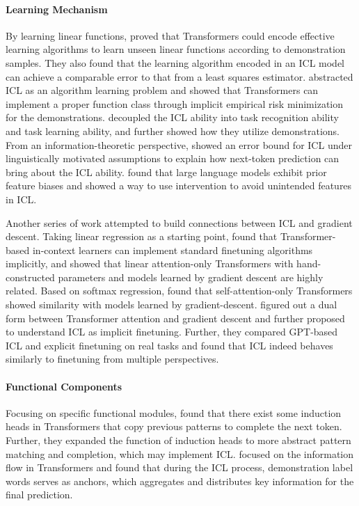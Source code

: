 \paragraph{Learning Mechanism} 
By learning linear functions, \citet{garg2022linear} proved that Transformers could encode effective learning algorithms to learn unseen linear functions according to demonstration samples. 
They also found that the learning algorithm encoded in an ICL model can achieve a comparable error to that from a least squares estimator. 
\citet{trm_as_alg} abstracted ICL as an algorithm learning problem and showed that Transformers can implement a proper function class through implicit empirical risk minimization for the demonstrations. 
\citet{tr_and_tl} decoupled the ICL ability into task recognition ability and task learning ability, and further showed how they utilize demonstrations. 
From an information-theoretic perspective, \citet{implicit_structure_induction} showed an error bound for ICL under linguistically motivated assumptions to explain how next-token prediction can bring about the ICL ability. 
\citet{inductive_bias} found that large language models exhibit prior feature biases and showed a way to use intervention to avoid unintended features in ICL. 

Another series of work attempted to build connections between ICL and gradient descent. 
Taking linear regression as a starting point, \citet{akyurek2022algorithm} found that Transformer-based in-context learners can implement standard finetuning algorithms implicitly, and \citet{icl_gd} showed that linear attention-only Transformers with hand-constructed parameters and models learned by gradient descent are highly related. 
Based on softmax regression, \citet{icl_weight_shifting} found that self-attention-only Transformers showed similarity with models learned by gradient-descent. 
\citet{dai2022iclft} figured out a dual form between Transformer attention and gradient descent and further proposed to understand ICL as implicit finetuning. 
Further, they compared GPT-based ICL and explicit finetuning on real tasks and found that ICL indeed behaves similarly to finetuning from multiple perspectives. 

\paragraph{Functional Components} 
Focusing on specific functional modules, \citet{olsson2022induction} found that there exist some induction heads in Transformers that copy previous patterns to complete the next token. 
Further, they expanded the function of induction heads to more abstract pattern matching and completion, which may implement ICL. 
\citet{label_anchor} focused on the information flow in Transformers and found that during the ICL process, demonstration label words serves as anchors, which aggregates and distributes key information for the final prediction. 

